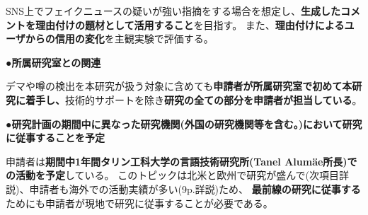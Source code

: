 {	SNS上でフェイクニュースの疑いが強い指摘をする場合を想定し、\textbf{生成したコメントを理由付けの題材として活用すること}を目指す。
	また、\textbf{理由付けによるユーザからの信用の変化}を主観実験で評価する。

	\noindent
	●\textbf{所属研究室との関連}

	デマや噂の検出を本研究が扱う対象に含めても\textbf{申請者が所属研究室で初めて本研究に着手し、}技術的サポートを除き\textbf{研究の全ての部分を申請者が担当している}。

	\noindent
	●\textbf{研究計画の期間中に異なった研究機関(外国の研究機関等を含む。)において研究に従事することを予定}
	
	申請者は\textbf{期間中1年間タリン工科大学の言語技術研究所(Tanel Alumäe所長)での活動を予定}している。
	このトピックは北米と欧州で研究が盛んで(次項目詳説)、申請者も海外での活動実績が多い(9p.詳説)ため、
	\textbf{最前線の研究に従事する}ためにも申請者が現地で研究に従事することが必要である。

}

\newcommand{\人権の保護及び法令等の遵守への対応}{%
	コメント取得を予定してしているSNSはTwitterである。
	Twitter社は2020年3月より学術目的でTwitter APIの利用を自由化しているほか、
	取得したツイートIDを含む情報をデータセットとして公開することも学術目的であれば認められている\cite{twitter_2020}。

	また、先行研究が提供したデータセットを使用する場合は、提供者が示すライセンスやポリシーを遵守する。

	なお、学習済みモデルの公表は平成30年改正著作権法第30条4号により認められている。

	ただし、本研究では主観評価実験としてSNSユーザを対象としたアンケート調査を予定している。
	この調査により収集したデータは、個⼈の特定につながる情報を匿名化した上で解析を⾏い、
	解析結果の公表に際しては、匿名化を⾏ったデータを⽤い、個⼈情報の漏洩防⽌に配慮する。

	{\footnotesize
		\begin{thebibliography}{99}
			\setcounter{enumiv}{12}
			\bibitem{twitter_2020} Twitter開発者ポリシーを分かりやすくアップデート, 2020年3月11日. (最終閲覧日 2020年4月19日) \url{https://blog.twitter.com/developer/ja_jp/topics/tools/2020/DevPolicyUpdate.html}
		\end{thebibliography}
	}
}

